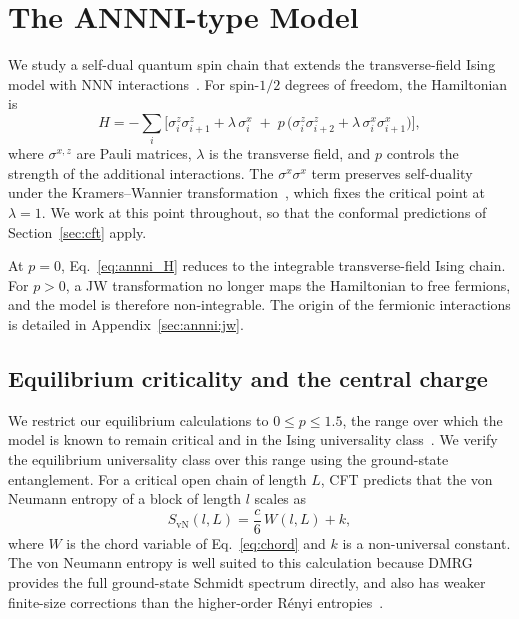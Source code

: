 \FloatBarrier
\section{The ANNNI-type Model}
\label{sec:annni}

We study a self-dual quantum spin chain that extends the transverse-field Ising model with \ac{NNN} interactions~\cite{alcaraz2016}. For spin-$1/2$ degrees of freedom, the Hamiltonian is
\begin{equation}
    H = - \sum_{i} \Big[ \sigma_i^z \sigma_{i+1}^z + \lambda\, \sigma_i^x
        \;+\; p\,\big( \sigma_i^z \sigma_{i+2}^z + \lambda\, \sigma_i^x \sigma_{i+1}^x \big) \Big],
    \label{eq:annni_H}
\end{equation}
where $\sigma^{x,z}$ are Pauli matrices, $\lambda$ is the transverse field, and $p$ controls the strength of the additional interactions. The $\sigma^x\sigma^x$ term preserves self-duality under the Kramers--Wannier transformation~\cite{alcaraz2016}, which fixes the critical point at $\lambda=1$. We work at this point throughout, so that the conformal predictions of Section~\ref{sec:cft} apply.

At $p=0$, Eq.~\eqref{eq:annni_H} reduces to the integrable transverse-field Ising chain. For $p>0$, a \ac{JW} transformation no longer maps the Hamiltonian to free fermions, and the model is therefore non-integrable. The origin of the fermionic interactions is detailed in Appendix~\ref{sec:annni:jw}.

\subsection{Equilibrium criticality and the central charge}
\label{sec:annni:equilibrium}

We restrict our equilibrium calculations to $0\le p\le1.5$, the range over which the model is known to remain critical and in the Ising universality class~\cite{alcaraz2016}. We verify the equilibrium universality class over this range using the ground-state entanglement. For a critical open chain of length $L$, \ac{CFT} predicts that the von Neumann entropy of a block of length $l$ scales as~\cite{holzhey1994,vidal2003,calabrese_cardy2004}
\begin{equation}
    S_{\mathrm{vN}}(l,L) = \frac{c}{6}\,W(l,L) + k,
    \label{eq:cft_obc}
\end{equation}
where $W$ is the chord variable of Eq.~\eqref{eq:chord} and $k$ is a non-universal constant. The von Neumann entropy is well suited to this calculation because \ac{DMRG} provides the full ground-state Schmidt spectrum directly, and also has weaker finite-size corrections than the higher-order R\'enyi entropies~\cite{cardy_calabrese2010,calabrese2010}.

